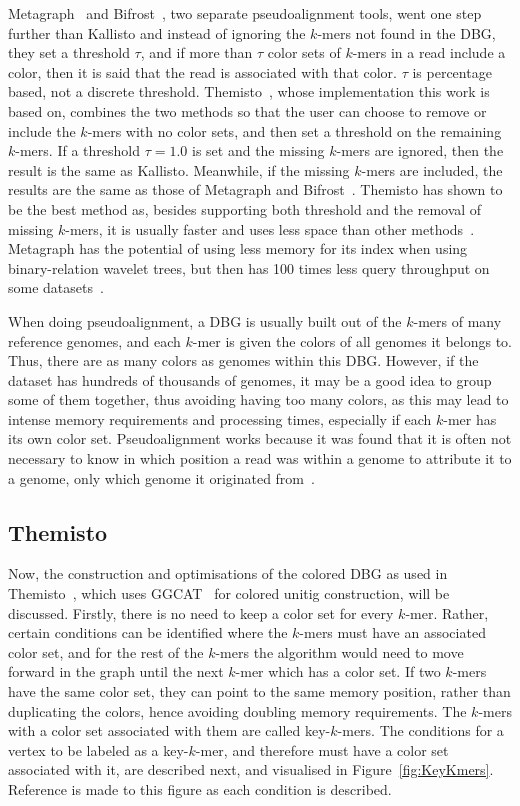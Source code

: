 Metagraph~\cite{Metagraph} and Bifrost~\cite{Bifrost}, two separate pseudoalignment tools, went one step further than Kallisto and instead of ignoring the $k$-mers not found in the DBG, they set a threshold $\tau$, and if more than $\tau$ color sets of $k$-mers in a read include a color, then it is said that the read is associated with that color.
$\tau$ is percentage based, not a discrete threshold.
Themisto~\cite{Themisto}, whose implementation this work is based on, combines the two methods so that the user can choose to remove or include the $k$-mers with no color sets, and then set a threshold on the remaining $k$-mers.
If a threshold $\tau=1.0$ is set and the missing $k$-mers are ignored, then the result is the same as Kallisto.
Meanwhile, if the missing $k$-mers are included, the results are the same as those of Metagraph and Bifrost~\cite{Themisto}.
Themisto has shown to be the best method as, besides supporting both threshold and the removal of missing $k$-mers, it is usually faster and uses less space than other methods~\cite{Themisto}.
Metagraph has the potential of using less memory for its index when using binary-relation wavelet trees, but then has 100 times less query throughput on some datasets~\cite{Themisto}.

When doing pseudoalignment, a DBG is usually built out of the $k$-mers of many reference genomes, and each $k$-mer is given the colors of all genomes it belongs to.
Thus, there are as many colors as genomes within this DBG.
However, if the dataset has hundreds of thousands of genomes, it may be a good idea to group some of them together, thus avoiding having too many colors, as this may lead to intense memory requirements and processing times, especially if each $k$-mer has its own color set.
Pseudoalignment works because it was found that it is often not necessary to know in which position a read was within a genome to attribute it to a genome, only which genome it originated from~\cite{Kallisto}.

\subsection{Themisto}

Now, the construction and optimisations of the colored DBG as used in Themisto~\cite{Themisto}, which uses GGCAT~\cite{GGCAT} for colored unitig construction, will be discussed.
Firstly, there is no need to keep a color set for every $k$-mer.
Rather, certain conditions can be identified where the $k$-mers must have an associated color set, and for the rest of the $k$-mers the algorithm would need to move forward in the graph until the next $k$-mer which has a color set.
If two $k$-mers have the same color set, they can point to the same memory position, rather than duplicating the colors, hence avoiding doubling memory requirements.
The $k$-mers with a color set associated with them are called key-$k$-mers.
The conditions for a vertex to be labeled as a key-$k$-mer, and therefore must have a color set associated with it, are described next, and visualised in Figure~\ref{fig:KeyKmers}.
Reference is made to this figure as each condition is described.

